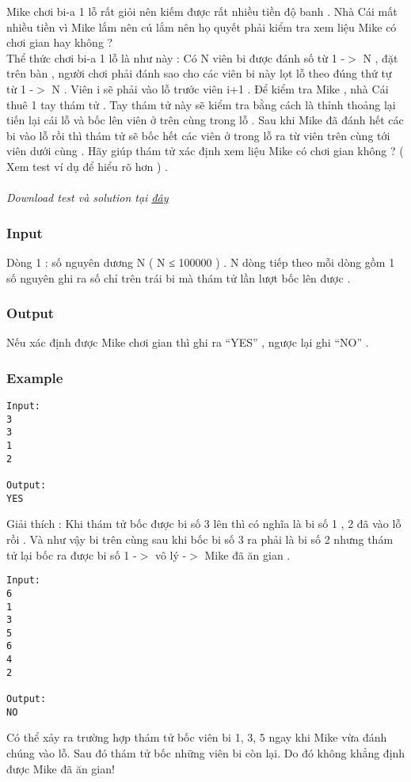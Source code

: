 



   Mike chơi bi-a 1 lỗ rất giỏi nên kiếm được rất nhiều tiền độ banh . Nhà Cái mất nhiều tiền vì Mike lắm nên cú lắm nên họ quyết phải kiểm tra xem liệu Mike có chơi gian hay không ?   
\\   Thể thức chơi bi-a 1 lỗ là như này : Có N viên bi được đánh số từ 1 -$>$ N , đặt trên bàn , người chơi phải đánh sao cho các viên bi này lọt lỗ theo đúng thứ tự từ 1 -$>$ N . Viên i sẽ phải vào lỗ trước viên i+1 . Để kiểm tra Mike , nhà Cái thuê 1 tay thám tử . Tay thám tử này sẽ kiểm tra bằng cách là thỉnh thoảng lại tiến lại cái lỗ và bốc lên viên ở trên cùng trong lỗ . Sau khi Mike đã đánh hết các bi vào lỗ rồi thì thám tử sẽ bốc hết các viên ở trong lỗ ra từ viên trên cùng tới viên dưới cùng . Hãy giúp thám tử xác định xem liệu Mike có chơi gian không ? ( Xem test ví dụ để hiểu rõ hơn ) .   
\\
\\\textit{    Download test và solution tại    \href{https://vn.spoj.pl/content/cheat.zip}{     đây    }}

\subsubsection{   Input  }

   Dòng 1 : số nguyên dương N ( N ≤ 100000 ) . N dòng tiếp theo mỗi dòng gồm 1 số nguyên ghi ra số chỉ trên trái bi mà thám tử lần lượt bốc lên được .  

\subsubsection{   Output  }

   Nếu xác định được Mike chơi gian thì ghi ra “YES” , ngược lại ghi “NO” .  

\subsubsection{   Example  }
\begin{verbatim}
Input:
3
3
1
2

Output:
YES
\end{verbatim}

   Giải thích : Khi thám tử bốc được bi số 3 lên thì có nghĩa là bi số 1 , 2 đã vào lỗ rồi . Và như vậy bi trên cùng sau khi bốc bi số 3 ra phải là bi số 2 nhưng thám tử lại bốc ra được bi số 1 -$>$ vô lý -$>$ Mike đã ăn gian .  
\begin{verbatim}
Input:
6
1
3
5
6
4
2

Output:
NO
\end{verbatim}

   Có thể xảy ra trường hợp thám tử bốc viên bi 1, 3, 5 ngay khi Mike vừa đánh chúng vào lỗ. Sau đó thám tử bốc những viên bi còn lại. Do đó không khẳng định được Mike đã ăn gian!  